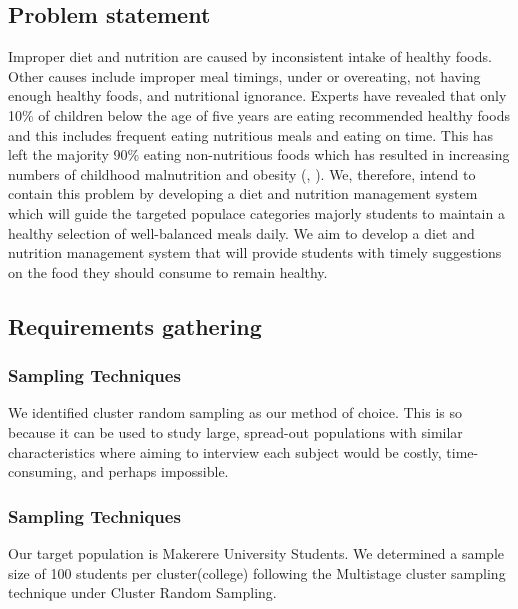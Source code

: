 \documentclass{article}
\begin{document}
\subsection{Problem statement}
Improper diet and nutrition are caused by inconsistent intake of healthy foods. Other causes include improper meal timings, under or overeating, not having enough healthy foods, and nutritional ignorance. Experts have revealed that only 10\% of children below the age of five years are eating recommended healthy foods and this includes frequent eating nutritious meals and eating on time. This has left the majority 90\% eating non-nutritious foods which has resulted in increasing numbers of childhood malnutrition and obesity (\citeauthor{tumwine2022only}, \citeyear{tumwine2022only}). We, therefore, intend to contain this problem by developing a diet and nutrition management system which will guide the targeted populace categories majorly students to maintain a healthy selection of well-balanced meals daily. We aim to develop a diet and nutrition management system that will provide students with timely suggestions on the food they should consume to remain healthy. 

\subsection{Requirements gathering}
\subsubsection{Sampling Techniques}
We identified cluster random sampling as our method of choice. This is so because it can be used to study large, spread-out populations with similar characteristics where aiming to interview each subject would be costly, time-consuming, and perhaps impossible.

\subsubsection{Sampling Techniques}
Our target population is Makerere University Students.  We determined a sample size of 100 students per cluster(college) following the Multistage cluster sampling technique under Cluster Random Sampling.
\end{document}
